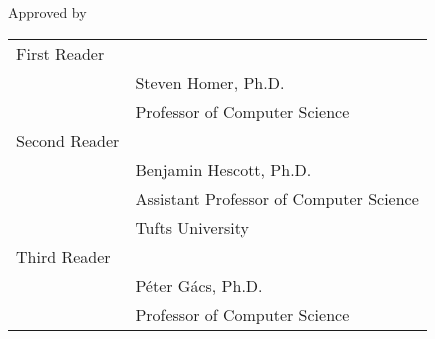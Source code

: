 \newenvironment{readerspage}
  {\thispagestyle{empty}}
  {\newpage}

\begin{readerspage}
  \begin{center}
    Approved by
  \end{center}
  \vspace{21ex}
  \renewcommand{\arraystretch}{0.6}
  \begin{tabular}{l p{4.5in}}
    First Reader & \hrulefill \\
    & Steven Homer, Ph.D. \\
    & Professor of Computer Science \\[13ex]

    Second Reader & \hrulefill \\
    & Benjamin Hescott, Ph.D. \\
    & Assistant Professor of Computer Science \\
    & Tufts University \\[11ex]

    Third Reader & \hrulefill \\
    & Péter Gács, Ph.D. \\
    & Professor of Computer Science
  \end{tabular}
\end{readerspage}

